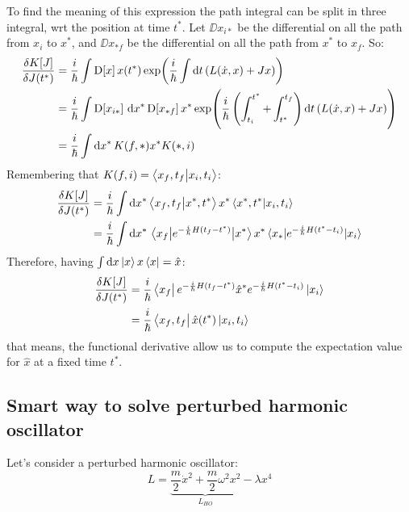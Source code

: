 \documentclass[main.tex]{subfiles}
\begin{document}
To find the meaning of this expression the path integral can be split in three integral, wrt the position at time $t^*$. Let $\DD{x_{i*}}$ be the differential on all the path from $x_i$ to $x^*$, and $\DD{x_{*f}}$ be the differential on all the path from $x^*$ to $x_f$. So:
\begin{align}
\fdv{K[J]}{J(t^*)} &= \frac{i}{\hbar}\int \DD{x} x(t^*) \exp(\frac{i}{\hbar} \int \dd{t} (L(\dot{x},x) + J x) ) \\
				   &= \frac{i}{\hbar}\int \DD{x_{i*}} \dd{x^*} \DD{x_{*f}} x^* \exp(\frac{i}{\hbar} \left(\int_{t_i}^{t^*} + \int_{t^*}^{t_f} \right) \dd{t} (L(\dot{x},x) + J x) ) \\
				   &= \frac{i}{\hbar}\int \dd{x^*} K(f,*) x^* K(*,i)
\end{align}
Remembering that $K(f,i) = \braket{x_f,t_f}{x_i,t_i}$:
\begin{align}
\fdv{K[J]}{J(t^*)} &= \frac{i}{\hbar}\int \dd{x^*} \braket{x_f,t_f}{x^*,t^*} x^* \braket{x^*,t^*}{x_i,t_i} \\
	&= \frac{i}{\hbar}\int \dd{x^*} \mel{x_f}{e^{-\frac{i}{\hbar}H(t_f-t^*)}}{x^*} x^* \mel{x_*}{e^{-\frac{i}{\hbar}H(t^*-t_i)}}{x_i}
\end{align}
Therefore, having $\int \dd{x} \ket{x} x \bra{x} = \hat{x}$:
\begin{align}
\fdv{K[J]}{J(t^*)} &= \frac{i}{\hbar}\bra{x_f} e^{-\frac{i}{\hbar}H(t_f-t^*)} \hat{x}^* e^{-\frac{i}{\hbar}H(t^*-t_i)} \ket{x_i} \\
	&= \frac{i}{\hbar}\bra{x_f,t_f} \hat{x}(t^*) \ket{x_i,t_i}
\end{align}
that means, the functional derivative allow us to compute the expectation value for $\hat{x}$ at a fixed time $t^*$.

\subsection{Smart way to solve perturbed harmonic oscillator}
Let's consider a perturbed harmonic oscillator:
\begin{equation}
L = \underbrace{\frac{m}{2}\dot{x}^2 + \frac{m}{2}\omega^2x^2}_{L_{HO}} - \lambda x^4
\end{equation}
\end{document}
